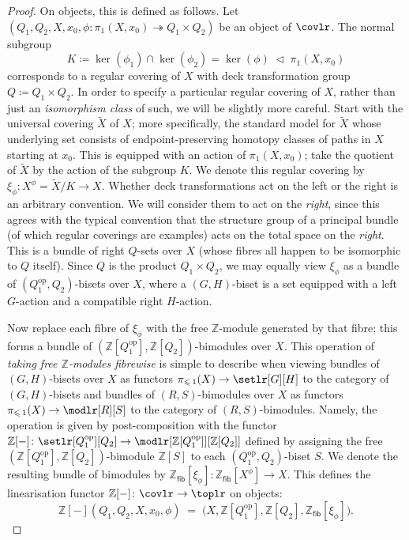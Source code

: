 \documentclass[AHL,Unicode,published]{cedram}
\newcommand{\opp}{\ensuremath{\mathrm{op}}}
\newcommand{\fib}{\ensuremath{\mathsf{fib}}}
\newcommand{\bZ}{\mathbb{Z}}
\renewcommand{\leq}{\leqslant}
\begin{document}
\begin{proof}
On objects, this is defined as follows. Let $(Q_{1},Q_{2},X,x_{0},\phi \colon \pi_{1}(X,x_{0}) \twoheadrightarrow Q_{1} \times Q_{2})$ be an object of $\covlr$. The normal subgroup
\begin{equation}\label{eq:kernel-intersection}
K \coloneqq \ker(\phi_{1}) \cap \ker(\phi_{2}) = \ker(\phi) \;\triangleleft\; \pi_{1}(X,x_{0})
\end{equation}
corresponds to a regular covering of $X$ with deck transformation group $Q \coloneqq Q_{1} \times Q_{2}$. In order to specify a particular regular covering of $X$, rather than just an \emph{isomorphism class} of such, we will be slightly more careful. Start with the universal covering $\widetilde{X}$ of $X$; more specifically, the standard model for $\widetilde{X}$ whose underlying set consists of endpoint-preserving homotopy classes of paths in $X$ starting at $x_{0}$. This is equipped with an action of $\pi_{1}(X,x_{0})$; take the quotient of $\widetilde{X}$ by the action of the subgroup $K$. We denote this regular covering by $\xi_{\phi} \colon X^\phi = \widetilde{X}/K \rightarrow X$. Whether deck transformations act on the left or the right is an arbitrary convention. We will consider them to act on the \emph{right}, since this agrees with the typical convention that the structure group of a principal bundle (of which regular coverings are examples) acts on the total space on the \emph{right}. This is a bundle of right $Q$-sets over $X$ (whose fibres all happen to be isomorphic to $Q$ itself). Since $Q$ is the product $Q_{1} \times Q_{2}$, we may equally view $\xi_{\phi}$ as a bundle of $(Q_{1}^{\opp},Q_{2})$-bisets over $X$, where a $(G,H)$-biset is a set equipped with a left $G$-action and a compatible right $H$-action.

Now replace each fibre of $\xi_{\phi}$ with the free $\bZ$-module generated by that fibre; this forms a bundle of $(\bZ[Q_{1}^{\opp}],\bZ[Q_{2}])$-bimodules over $X$. This operation of \emph{taking free $\bZ$-modules fibrewise} is simple to describe when viewing bundles of $(G,H)$-bisets over $X$ as functors $\pi_{\leq\,1}(X) \to \setlr[G][H]$ to the category of $(G,H)$-bisets and bundles of $(R,S)$-bimodules over $X$ as functors $\pi_{\leq\,1}(X) \to \modlr[R][S]$ to the category of $(R,S)$-bimodules. Namely, the operation is given by post-composition with the functor $\bZ[-] \colon \setlr[Q_{1}^{\opp}][Q_{2}] \rightarrow \modlr[{\bZ[Q_{1}^{\opp}]}][{\bZ[Q_{2}]}]$ defined by assigning the free $(\bZ[Q_{1}^{\opp}],\bZ[Q_{2}])$-bimodule $\bZ[S]$ to each $(Q_{1}^{\opp},Q_{2})$-biset $S$. We denote the resulting bundle of bimodules by $\bZ_{\fib}[\xi_{\phi}] \colon \bZ_{\fib}[X^\phi] \rightarrow X$. This defines the linearisation functor $\bZ[-]\colon \covlr \to \toplr$ on objects:
\[
\bZ[-](Q_{1},Q_{2},X,x_{0},\phi) \;=\; \big(X,\bZ[Q_{1}^{\opp}],\bZ[Q_{2}],\bZ_{\fib}[\xi_{\phi}]\big).
\]


\end{proof}
\end{document}

